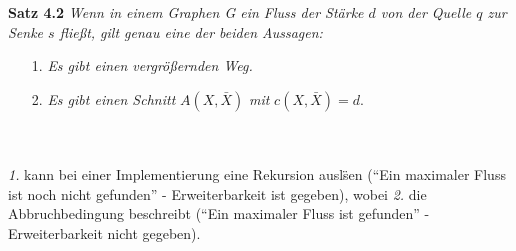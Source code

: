 \documentclass[11pt]{article}
\begin{document}
    \textbf{Satz 4.2} \textit{Wenn in einem Graphen G ein Fluss der St\"arke $d$ von der Quelle $q$ zur Senke $s$ flie\ss{}t, gilt genau eine der beiden Aussagen:}
    \begin{itemize}
        \item[1.] \textit{Es gibt einen vergr\"o\ss{}ernden Weg.}
        \item[2.] \textit{Es gibt einen Schnitt} $A(X,\bar X)$ \textit{mit} $c(X,\bar X) = d$.
    \end{itemize}\\~\\
    \textit{1.} kann bei einer Implementierung eine Rekursion ausl\"sen ("`Ein maximaler Fluss ist noch nicht gefunden"' - Erweiterbarkeit ist gegeben), wobei \textit{2.} die Abbruchbedingung beschreibt ("`Ein maximaler Fluss ist gefunden"' - Erweiterbarkeit nicht gegeben).
\end{document}
